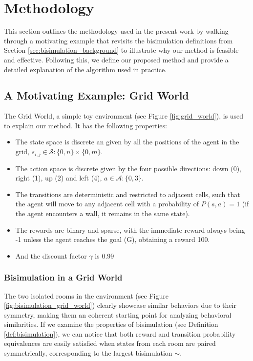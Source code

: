 
\chapter{Methodology}
This section outlines the methodology used in the present work by walking through a motivating example that revisits the bisimulation definitions from Section \ref{sec:bisimulation_background} to illustrate why our method is feasible and effective. Following this, we define our proposed method and provide a detailed explanation of the algorithm used in practice.

\section{A Motivating Example: Grid World}
\label{sec:motivating_example}

The Grid World, a simple toy environment (see Figure \ref{fig:grid_world}), is used to explain our method. It has the following properties:

\begin{itemize}
    \item The state space is discrete an given by all the positions of the agent in the grid, $ s_{i,j} \in \mathcal{S} : \{0,n\} \times \{0,m\}$.
    \item The action space is discrete given by the four possible directions: down (0), right (1), up (2) and left (4), $a \in \mathcal{A}: \{0,3\}$.
    \item The transitions are deterministic and restricted to adjacent cells, such that the agent will move to any adjacent cell with a probability of $P(s,a) = 1$ (if the agent encounters a wall, it remains in the same state).
    \item The rewards are binary and sparse, with the immediate reward always being -1 unless the agent reaches the goal (G), obtaining a reward 100.
    \item And the discount factor $\gamma$ is 0.99
\end{itemize}

\subsection{Bisimulation in a Grid World}

The two isolated rooms in the environment (see Figure \ref{fig:bisimulation_grid_world}) clearly showcase similar behaviors due to their symmetry, making them an coherent starting point for analyzing behavioral similarities. If we examine the properties of bisimulation (see Definition \ref{def:bisimulation}), we can notice that both reward and transition probability equivalences are easily satisfied when states from each room are paired symmetrically, corresponding to the largest bisimulation $\sim$.

